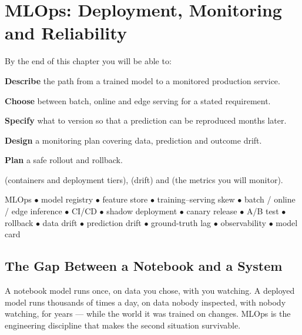\chapter{MLOps: Deployment, Monitoring and Reliability}\label{ch:mlops}

\begin{outcomes}
By the end of this chapter you will be able to:
\begin{tight}
  \item \textbf{Describe} the path from a trained model to a monitored production service.
  \item \textbf{Choose} between batch, online and edge serving for a stated requirement.
  \item \textbf{Specify} what to version so that a prediction can be reproduced months later.
  \item \textbf{Design} a monitoring plan covering data, prediction and outcome drift.
  \item \textbf{Plan} a safe rollout and rollback.
\end{tight}
\end{outcomes}

\begin{prereq}
 (containers and deployment tiers),  (drift) and
 (the metrics you will monitor).
\end{prereq}

\begin{keyterms}
MLOps $\bullet$ model registry $\bullet$ feature store $\bullet$ training--serving
skew $\bullet$ batch / online / edge inference $\bullet$ CI/CD $\bullet$ shadow
deployment $\bullet$ canary release $\bullet$ A/B test $\bullet$ rollback $\bullet$
data drift $\bullet$ prediction drift $\bullet$ ground-truth lag $\bullet$
observability $\bullet$ model card
\end{keyterms}

\section{The Gap Between a Notebook and a System}

\begin{conceptbox}
A notebook model runs once, on data you chose, with you watching. A deployed model
runs thousands of times a day, on data nobody inspected, with nobody watching, for
years --- while the world it was trained on changes. MLOps is the engineering
discipline that makes the second situation survivable.
\end{conceptbox}

